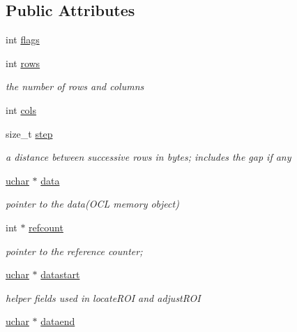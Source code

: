 \subsection*{Public Attributes}
\begin{DoxyCompactItemize}
\item 
int \hyperlink{classcv_1_1ocl_1_1oclMat_ae53eaacd0018d7b762a5c69c9a1d0d5f}{flags}
\item 
int \hyperlink{classcv_1_1ocl_1_1oclMat_a1ccf0125fff51e419aa89b144ed511be}{rows}
\begin{DoxyCompactList}\small\item\em the number of rows and columns \end{DoxyCompactList}\item 
int \hyperlink{classcv_1_1ocl_1_1oclMat_ac814acb1fd2613d43e5fbb9c2166ac9f}{cols}
\item 
size\-\_\-t \hyperlink{classcv_1_1ocl_1_1oclMat_a5449adbd0cfb2cd99a84282d5b4ae8fb}{step}
\begin{DoxyCompactList}\small\item\em a distance between successive rows in bytes; includes the gap if any \end{DoxyCompactList}\item 
\hyperlink{core_2types__c_8h_a65f85814a8290f9797005d3b28e7e5fc}{uchar} $\ast$ \hyperlink{classcv_1_1ocl_1_1oclMat_a9eeb429cbc7aca93239988592a40aac5}{data}
\begin{DoxyCompactList}\small\item\em pointer to the data(\-O\-C\-L memory object) \end{DoxyCompactList}\item 
int $\ast$ \hyperlink{classcv_1_1ocl_1_1oclMat_a5209f38351516306c7e045fea768ae41}{refcount}
\begin{DoxyCompactList}\small\item\em pointer to the reference counter; \end{DoxyCompactList}\item 
\hyperlink{core_2types__c_8h_a65f85814a8290f9797005d3b28e7e5fc}{uchar} $\ast$ \hyperlink{classcv_1_1ocl_1_1oclMat_a475b64df881ea635c8990837c5bf5822}{datastart}
\begin{DoxyCompactList}\small\item\em helper fields used in locate\-R\-O\-I and adjust\-R\-O\-I \end{DoxyCompactList}\item 
\hyperlink{core_2types__c_8h_a65f85814a8290f9797005d3b28e7e5fc}{uchar} $\ast$ \hyperlink{classcv_1_1ocl_1_1oclMat_a0fd49cee884addef5f6302a7246be445}{dataend}

\end{DoxyCompactItemize}

